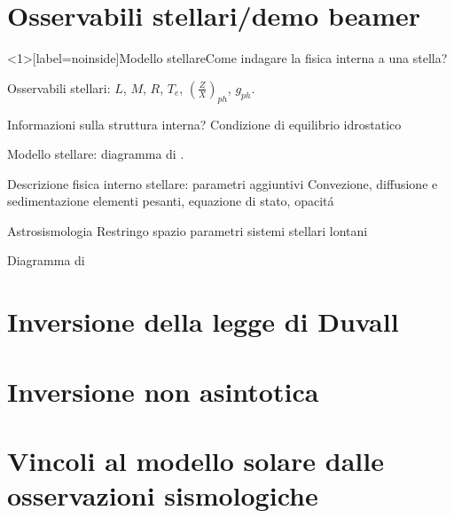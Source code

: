 \section{Osservabili stellari/demo beamer}

\begin{frame}<1>[label=noinside]{Modello stellare}{Come indagare la fisica interna a una stella?}

\begin{block}{Osservabili stellari:}
$L$, $M$, $R$, $T_e$, $(\frac{Z}{X})_{ph}$, $g_{ph}$.
\end{block}

\begin{block}{Informazioni sulla struttura interna?} Condizione di equilibrio idrostatico
\end{block}


\begin{block}{Modello stellare: diagramma di \hr{}.}
\end{block}

\begin{block}{Descrizione fisica interno stellare: parametri aggiuntivi}
Convezione, diffusione e sedimentazione elementi pesanti, equazione di stato, opacit\'a
\end{block}

\begin{block}{Astrosismologia}
Restringo spazio parametri sistemi stellari lontani
\end{block}

\end{frame}

{ %
    \begin{frame}[plain]{Diagramma di \hr{}}
     \end{frame}
}

\section{Inversione della legge di Duvall}

\section{Inversione non asintotica}

\section{Vincoli al modello solare dalle osservazioni sismologiche}